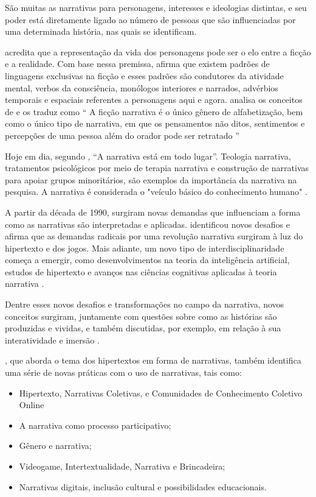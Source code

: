 São muitas as narrativas para personagens, interesses e ideologias distintas, e seu poder está diretamente ligado ao número de pessoas que são influenciadas por uma determinada história, nas quais se identificam.

\citet{hamburger_logic_1973} acredita que a representação da vida dos personagens pode ser o elo entre a ficção e a realidade.
Com base nessa premissa, \citeauthor{hamburger_logic_1973} afirma que existem padrões de linguagens exclusivas na ficção e esses padrões são condutores da atividade mental, verbos da consciência, monólogos interiores e narrados, advérbios temporais e espaciais referentes a personagens aqui e agora.
\citet{cohn_transparent_1984} analisa os conceitos de \citeauthor{hamburger_logic_1973} e os traduz como `` A ficção narrativa é o único gênero de alfabetização, bem como o único tipo de narrativa, em que os pensamentos não ditos, sentimentos e percepções de uma pessoa além do orador pode ser retratado ''

Hoje em dia, segundo \citet{richardson_recent_2000}, ``A narrativa está em todo lugar''. Teologia narrativa, tratamentos psicológicos por meio de terapia narrativa e construção de narrativas para apoiar grupos minoritários, são exemplos da importância da narrativa na pesquisa. A narrativa é considerada o "veículo básico do conhecimento humano" \citep{richardson_recent_2000}.

A partir da década de 1990, surgiram novas demandas que influenciam a forma como as narrativas são interpretadas e aplicadas. \citet{aarseth_cybertext_1997} identificou novos desafios e afirma que as demandas radicais por uma revolução narrativa surgiram à luz do hipertexto e dos jogos. Mais adiante, um novo tipo de interdisciplinaridade começa a emergir, como desenvolvimentos na teoria da inteligência artificial, estudos de hipertexto e avanços nas ciências cognitivas aplicadas à teoria narrativa \citep{richardson_recent_2000}.

Dentre esses novos desafios e transformações no campo da narrativa, novos conceitos surgiram, juntamente com questões sobre como as histórias são produzidas e vividas, e também discutidas, por exemplo, em relação à sua interatividade e imersão \citep{page_new_2011}.

\citet{page_new_2011}, que aborda o tema dos hipertextos em forma de narrativas, também identifica uma série de novas práticas com o uso de narrativas, tais como:

\begin{itemize}
    \item Hipertexto, Narrativas Coletivas,
e Comunidades de Conhecimento Coletivo Online
    \item A narrativa como processo participativo;
    \item Gênero e narrativa;
    \item Videogame, Intertextualidade, Narrativa e Brincadeira;
    \item Narrativas digitais, inclusão cultural e possibilidades educacionais.
\end{itemize}

